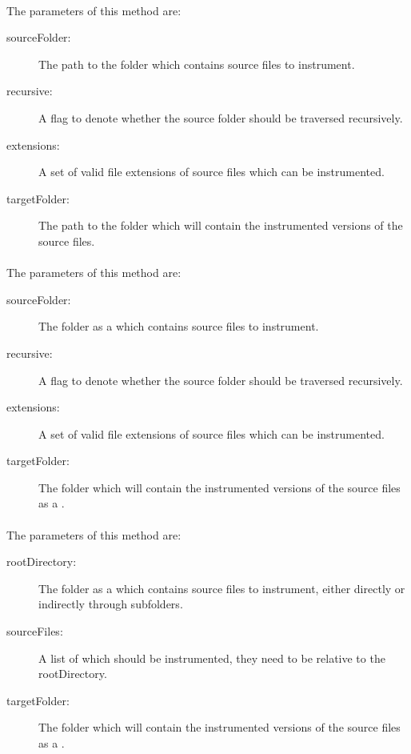 \paragraph{} \label{Classes:Instrumentation:Instrumenter:instrumentFolder_ext}
The parameters of this method are:
\begin{description}
\item[sourceFolder:] The path to the folder which contains source files to instrument.
\item[recursive:] A flag to denote whether the source folder should be traversed recursively.
\item[extensions:] A set of valid file extensions of source files which can be instrumented.
\item[targetFolder:] The path to the folder which will contain the instrumented versions of the source files.
\end{description}
\paragraph{} \label{Classes:Instrumentation:Instrumenter:instrumentFolder_ext_file}
The parameters of this method are:
\begin{description}
\item[sourceFolder:] The folder as a  which contains source files to instrument.
\item[recursive:] A flag to denote whether the source folder should be traversed recursively.
\item[extensions:] A set of valid file extensions of source files which can be instrumented.
\item[targetFolder:] The folder which will contain the instrumented versions of the source files as a .
\end{description}
\paragraph{} \label{Classes:Instrumentation:Instrumenter:instrumentAll}
The parameters of this method are:
\begin{description}
\item[rootDirectory:] The folder as a  which contains source files to instrument, either directly or indirectly through subfolders.
\item[sourceFiles:] A list of  which should be instrumented, they need to be relative to the rootDirectory.
\item[targetFolder:] The folder which will contain the instrumented versions of the source files as a .
\end{description}




